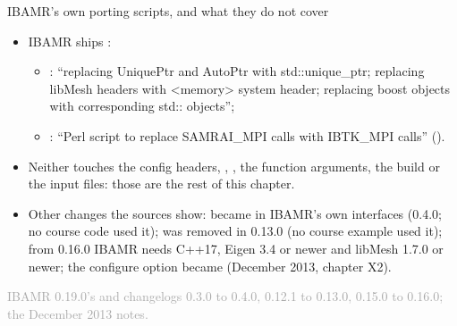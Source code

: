 \documentclass[aspectratio=169,11pt]{beamer}
\newcommand{\sourcecredit}[1]{\vfill\begin{flushright}\tiny\textcolor{DarkGray}{#1}\end{flushright}}
\begin{document}
\begin{frame}{IBAMR's own porting scripts, and what they do not cover}
\label{fr:scripts}
\small
\begin{itemize}\setlength{\itemsep}{3pt}
  \item IBAMR ships :
  \begin{itemize}\setlength{\itemsep}{1pt}
    \item {}: ``replacing UniquePtr and AutoPtr with std::unique\_ptr; replacing libMesh headers with <memory> system header; replacing boost objects with corresponding std:: objects'';
    \item {}: ``Perl script to replace SAMRAI\_MPI calls with IBTK\_MPI calls'' ().
  \end{itemize}
  \item Neither touches the config headers, , , the function arguments, the build or the input files: those are the rest of this chapter.
  \item Other changes the sources show:  became  in IBAMR's own interfaces (0.4.0; no course code used it);  was removed in 0.13.0 (no course example used it); from 0.16.0 IBAMR needs C++17, Eigen 3.4 or newer and libMesh 1.7.0 or newer; the configure option  became  (December 2013, chapter X2).
\end{itemize}
\sourcecredit{IBAMR 0.19.0's  and changelogs 0.3.0 to 0.4.0, 0.12.1 to 0.13.0, 0.15.0 to 0.16.0; the December 2013 notes.}
\end{frame}
\end{document}
